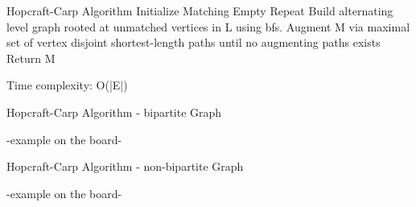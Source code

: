 \begin{frame}{Hopcraft-Carp Algorithm}
Initialize Matching Empty 
Repeat
	Build alternating level graph rooted at unmatched vertices in L using bfs.
	Augment M via maximal set of vertex disjoint shortest-length paths
	until no augmenting paths exists
	Return M
		
Time complexity: O(|E|)
  
\end{frame}

\begin{frame}{Hopcraft-Carp Algorithm - bipartite Graph}

-example on the board-
  
\end{frame}

\begin{frame}{Hopcraft-Carp Algorithm - non-bipartite Graph}

-example on the board-
  
\end{frame}